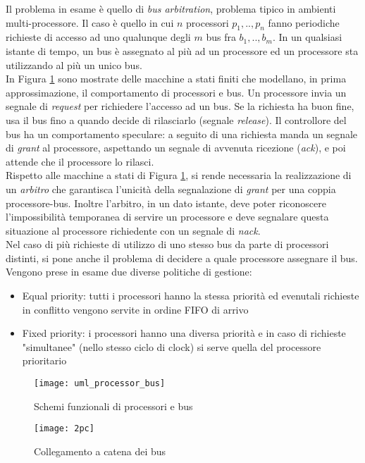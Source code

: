 Il problema in esame è quello di \textit{bus arbitration}, problema tipico in ambienti multi-processore. Il caso è quello in cui $n$ processori ${p_1,..,p_n}$  fanno periodiche richieste di accesso ad uno qualunque degli $m$ bus fra ${b_1,..,b_m}$. In un qualsiasi istante di tempo, un bus è assegnato al più ad un processore ed un processore sta utilizzando al più un unico bus.\\
In Figura \ref{Fig:uml} sono mostrate delle macchine a stati finiti che modellano, in prima approssimazione, il comportamento di processori e bus. Un processore invia un segnale di \textit{request} per richiedere l'accesso ad un bus. Se la richiesta ha buon fine, usa il bus fino a quando decide di rilasciarlo (segnale \textit{release}). Il controllore del bus ha un comportamento speculare: a seguito di una richiesta manda un segnale di \textit{grant} al processore, aspettando un segnale di avvenuta ricezione (\textit{ack}), e poi attende che il processore lo rilasci.\\
Rispetto alle macchine a stati di Figura \ref{Fig:uml}, si rende necessaria la realizzazione di un \textit{arbitro} che garantisca l’unicità della segnalazione di \textit{grant} per una coppia processore-bus. Inoltre l’arbitro, in un dato istante, deve poter riconoscere l’impossibilità temporanea di servire un processore e deve segnalare questa situazione al processore richiedente con un segnale di \textit{nack}.\\
Nel caso di più richieste di utilizzo di uno stesso bus da parte di processori distinti, si pone anche il problema di decidere a quale processore assegnare il bus. Vengono prese in esame due diverse politiche di gestione:
\begin{itemize}
\item Equal priority:  tutti i processori hanno la stessa priorità ed evenutali richieste in conflitto vengono servite in ordine FIFO di arrivo
\item Fixed priority:  i processori hanno una diversa priorità e in caso di richieste "simultanee" (nello stesso ciclo di clock) si serve quella del processore prioritario
\end{itemize}
\begin{center}
\begin{figure}
\texttt{[image: uml\_processor\_bus]}
\caption{Schemi funzionali di processori e bus}
\label{Fig:uml}
\end{figure}
\begin{figure}
\texttt{[image: 2pc]}
\caption{Collegamento a catena dei bus}
\label{Fig:2pc}
\end{figure}
\end{center}
